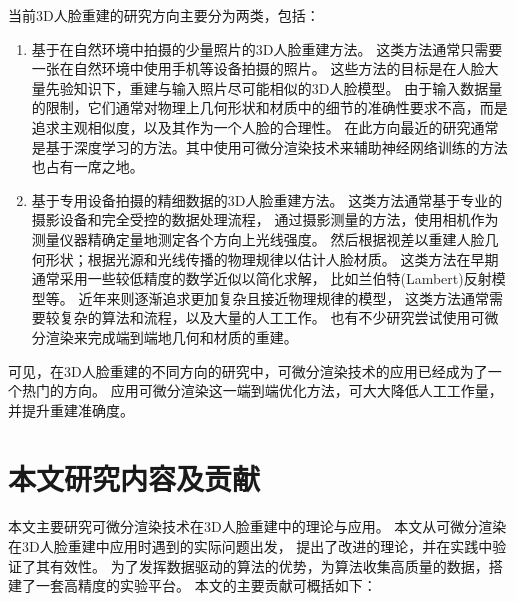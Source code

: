 当前3D人脸重建的研究方向主要分为两类，包括：
\begin{enumerate}
\item 基于在自然环境中拍摄的少量照片的3D人脸重建方法。
这类方法通常只需要一张在自然环境中使用手机等设备拍摄的照片。
这些方法的目标是在人脸大量先验知识下，重建与输入照片尽可能相似的3D人脸模型。
由于输入数据量的限制，它们通常对物理上几何形状和材质中的细节的准确性要求不高，而是追求主观相似度，以及其作为一个人脸的合理性。
在此方向最近的研究通常是基于深度学习的方法。其中使用可微分渲染技术来辅助神经网络训练的方法也占有一席之地。

\item 基于专用设备拍摄的精细数据的3D人脸重建方法。
这类方法通常基于专业的摄影设备和完全受控的数据处理流程，
通过摄影测量的方法，使用相机作为测量仪器精确定量地测定各个方向上光线强度。
然后根据视差以重建人脸几何形状；根据光源和光线传播的物理规律以估计人脸材质。
这类方法在早期通常采用一些较低精度的数学近似以简化求解，
比如兰伯特(Lambert)反射模型等。
近年来则逐渐追求更加复杂且接近物理规律的模型，
这类方法通常需要较复杂的算法和流程，以及大量的人工工作。
也有不少研究尝试使用可微分渲染来完成端到端地几何和材质的重建。

\end{enumerate}

可见，在3D人脸重建的不同方向的研究中，可微分渲染技术的应用已经成为了一个热门的方向。
应用可微分渲染这一端到端优化方法，可大大降低人工工作量，并提升重建准确度。

\section{本文研究内容及贡献}

本文主要研究可微分渲染技术在3D人脸重建中的理论与应用。
本文从可微分渲染在3D人脸重建中应用时遇到的实际问题出发，
提出了改进的理论，并在实践中验证了其有效性。
为了发挥数据驱动的算法的优势，为算法收集高质量的数据，搭建了一套高精度的实验平台。
本文的主要贡献可概括如下：

